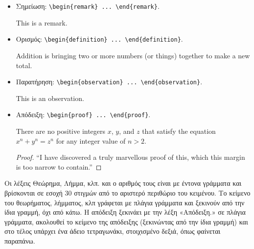 \begin{itemize}
	\item Σημείωση: \verb|\begin{remark} ... \end{remark}|.

	\begin{remark}
		This is a remark.
	\end{remark}

	\item Ορισμός: \verb|\begin{definition} ... \end{definition}|.

	\begin{definition}
		Addition is bringing two or more numbers (or things) together to make 
		a new total.
	\end{definition}

	\item Παρατήρηση: \verb|\begin{observation} ... \end{observation}|.

	\begin{observation}
		This is an observation.
	\end{observation}

	\item Aπόδειξη: \verb|\begin{proof} ... \end{proof}|.

	\begin{theorem}
		There are no positive integers $x$, $y$, and $z$ that satisfy the 
		equation $x^{n} + y^{n} = z^{n}$ for any integer value of $n > 2$.
	\end{theorem}
	\begin{proof}
		``I have discovered a truly marvellous proof of this, which this margin 
		is too narrow to contain.''
	\end{proof}
\end{itemize}

Οι λέξεις Θεώρημα, Λήμμα, κλπ. και ο αριθμός τους είναι με έντονα γράμματα και βρίσκονται σε εσοχή 30 στιγμών από το αριστερό περιθώριο του κειμένου.
Το κείμενο του θεωρήματος, λήμματος, κλπ γράφεται με πλάγια γράμματα και ξεκινούν από την ίδια γραμμή, όχι από κάτω.
Η απόδειξη ξεκινάει με την λέξη «Απόδειξη.» σε πλάγια γράμματα, ακολουθεί το κείμενο της απόδειξης (ξεκινώντας από την ίδια γραμμή) και στο τέλος υπάρχει ένα άδειο τετραγωνάκι, στοιχισμένο δεξιά, όπως φαίνεται παραπάνω.

